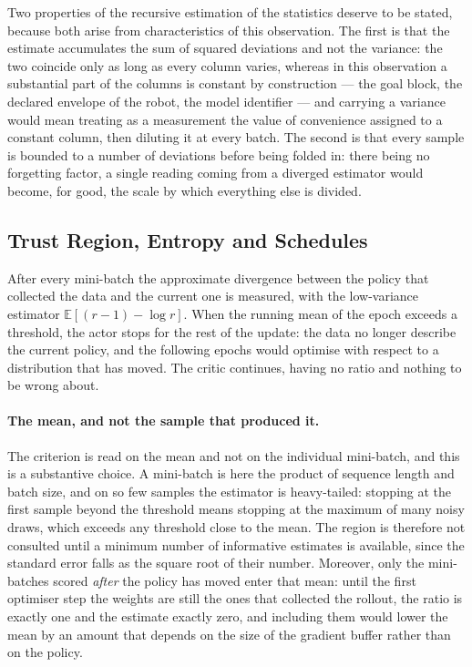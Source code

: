 Two properties of the recursive estimation of the statistics deserve to be
stated, because both arise from characteristics of this observation. The first
is that the estimate accumulates the sum of squared deviations and not the
variance: the two coincide only as long as every column varies, whereas in this
observation a substantial part of the columns is constant by construction ---
the goal block, the declared envelope of the robot, the model identifier --- and
carrying a variance would mean treating as a measurement the value of
convenience assigned to a constant column, then diluting it at every batch. The
second is that every sample is bounded to a number of deviations before being
folded in: there being no forgetting factor, a single reading coming from a
diverged estimator would become, for good, the scale by which everything else is
divided.

\subsection{Trust Region, Entropy and Schedules}
\label{sec:rl-schedules}

After every mini-batch the approximate divergence between the policy that
collected the data and the current one is measured, with the low-variance
estimator $\mathbb{E}[(r-1) - \log r]$. When the running mean of the epoch
exceeds a threshold, the actor stops for the rest of the update: the data no
longer describe the current policy, and the following epochs would optimise with
respect to a distribution that has moved. The critic continues, having no ratio
and nothing to be wrong about.

\paragraph{The mean, and not the sample that produced it.}
The criterion is read on the mean and not on the individual mini-batch, and this
is a substantive choice. A mini-batch is here the product of sequence length and
batch size, and on so few samples the estimator is heavy-tailed: stopping at the
first sample beyond the threshold means stopping at the maximum of many noisy
draws, which exceeds any threshold close to the mean. The region is therefore
not consulted until a minimum number of informative estimates is available,
since the standard error falls as the square root of their number. Moreover,
only the mini-batches scored \emph{after} the policy has moved enter that mean:
until the first optimiser step the weights are still the ones that collected the
rollout, the ratio is exactly one and the estimate exactly zero, and including
them would lower the mean by an amount that depends on the size of the gradient
buffer rather than on the policy.

